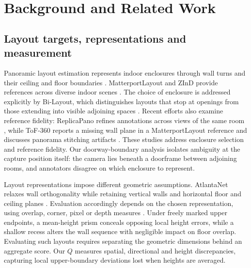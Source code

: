 \section{Background and Related Work}

\subsection{Layout targets, representations and measurement}
Panoramic layout estimation represents indoor enclosures through wall turns and their ceiling and floor boundaries \cite{c2ref01,horizon2019}. MatterportLayout and ZInD provide references across diverse indoor scenes \cite{zou2021manhattan,cruz2021zind}. The choice of enclosure is addressed explicitly by Bi-Layout, which distinguishes layouts that stop at openings from those extending into visible adjoining spaces \cite{c2ref06}. Recent efforts also examine reference fidelity: ReplicaPano refines annotations across views of the same room \cite{dong2024panocontext}, while ToF-360 reports a missing wall plane in a MatterportLayout reference and discusses panorama stitching artifacts \cite{kanayama2025tof360}. These studies address enclosure selection and reference fidelity. Our doorway-boundary analysis isolates ambiguity at the capture position itself: the camera lies beneath a doorframe between adjoining rooms, and annotators disagree on which enclosure to represent.

Layout representations impose different geometric assumptions. AtlantaNet relaxes wall orthogonality while retaining vertical walls and horizontal floor and ceiling planes \cite{pintore2020atlantanet}. Evaluation accordingly depends on the chosen representation, using overlap, corner, pixel or depth measures \cite{horizon2019,horizoneval,zou2021manhattan}. Under freely marked upper endpoints, a mean-height prism conceals opposing local height errors, while a shallow recess alters the wall sequence with negligible impact on floor overlap. Evaluating such layouts requires separating the geometric dimensions behind an aggregate score. Our $Q$ measures spatial, directional and height discrepancies, capturing local upper-boundary deviations lost when heights are averaged.

